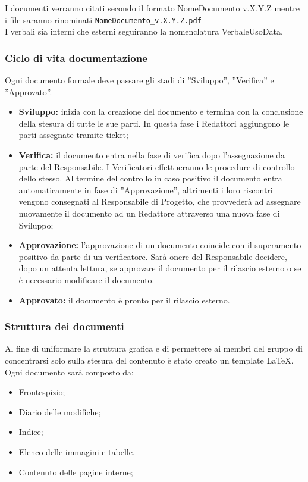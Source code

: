 I documenti verranno citati secondo il formato NomeDocumento v.X.Y.Z mentre i file saranno rinominati \texttt{NomeDocumento\_v.X.Y.Z.pdf} \\
I verbali sia interni che esterni seguiranno la nomenclatura VerbaleUsoData.

\subsubsection{Ciclo di vita documentazione}
Ogni documento formale deve passare gli stadi di ”Sviluppo”, ”Verifica” e ”Approvato”.
\begin{itemize}
	\item \textbf{Sviluppo:} inizia con la creazione del documento e termina con la conclusione	della stesura di tutte le sue parti. In questa fase i Redattori aggiungono le parti assegnate tramite ticket;
	
	\item  \textbf{Verifica:} il documento entra nella fase di verifica dopo l’assegnazione da
	parte del Responsabile. I Verificatori effettueranno le procedure di controllo
	dello stesso.
	Al termine del controllo in caso positivo il documento entra automaticamente
	in fase di ”Approvazione”, altrimenti i loro riscontri vengono consegnati
	al Responsabile di Progetto, che provvederà ad assegnare nuovamente il
	documento ad un Redattore attraverso una nuova fase di Sviluppo;
	
	\item  \textbf{Approvazione:} l’approvazione di un documento coincide con il superamento
	positivo da parte di un verificatore. 
	Sarà onere del Responsabile decidere, dopo un attenta lettura, se approvare il documento per il rilascio esterno o se è necessario modificare il documento.

	
	\item  \textbf{Approvato:} il documento è pronto per il rilascio esterno.
\end{itemize}


\subsubsection{Struttura dei documenti}
Al fine di uniformare la struttura grafica e di permettere ai membri del gruppo di concentrarsi solo sulla stesura del contenuto è stato creato un template \LaTeX.
Ogni documento sarà composto da:
\begin{itemize}
	\item Frontespizio;
	\item Diario delle modifiche;
	\item Indice;
	\item Elenco delle immagini e tabelle.
	\item Contenuto delle pagine interne;
\end{itemize}
